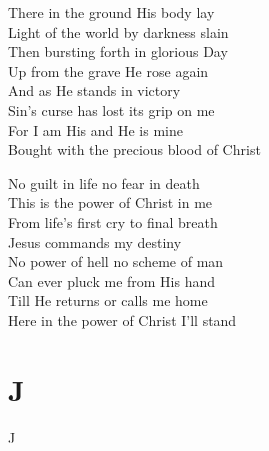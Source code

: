 \documentclass{beamer}
\begin{document}
{\begin{frame}{}
\end{frame}

\hypertarget{In Christ alone[]3}{}
\begin{frame}{}
\fontsize{ 18 }{ 23 }\selectfont

There in the ground His body lay\\ 
Light of the world by darkness slain\\ 
Then bursting forth in glorious Day\\ 
Up from the grave He rose again\\ 
And as He stands in victory\\ 
Sin's curse has lost its grip on me\\ 
For I am His and He is mine\\ 
Bought with the precious blood of Christ 

\end{frame}

\hypertarget{In Christ alone[]4}{}
\begin{frame}{}
\fontsize{ 18 }{ 23 }\selectfont

No guilt in life no fear in death\\ 
This is the power of Christ in me\\ 
From life's first cry to final breath\\ 
Jesus commands my destiny\\ 
No power of hell no scheme of man\\ 
Can ever pluck me from His hand\\ 
Till He returns or calls me home\\ 
Here in the power of Christ I'll stand 

\end{frame}

}
\section{J}

\begin{frame}{J}
\begin{columns}

    


    


\end{columns}

\end{frame}
\end{document}
